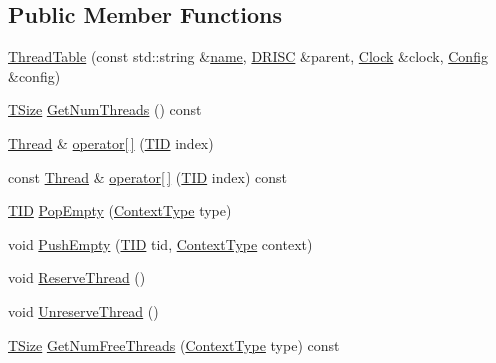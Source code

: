 \subsection*{Public Member Functions}
\begin{DoxyCompactItemize}
\item 
\hyperlink{class_simulator_1_1drisc_1_1_thread_table_af979f554a313e089a88590e09020aabd}{Thread\+Table} (const std\+::string \&\hyperlink{mtconf_8c_a8f8f80d37794cde9472343e4487ba3eb}{name}, \hyperlink{class_simulator_1_1_d_r_i_s_c}{D\+R\+I\+S\+C} \&parent, \hyperlink{class_simulator_1_1_clock}{Clock} \&clock, \hyperlink{class_config}{Config} \&config)
\item 
\hyperlink{namespace_simulator_aefe00209f3ea9f8e24874de522c3c3e7}{T\+Size} \hyperlink{class_simulator_1_1drisc_1_1_thread_table_a2df281eb0c42f337b5183f64367a4d29}{Get\+Num\+Threads} () const 
\item 
\hyperlink{struct_simulator_1_1drisc_1_1_thread}{Thread} \& \hyperlink{class_simulator_1_1drisc_1_1_thread_table_a19d5cbc35cf65207390d7cbf8863a253}{operator\mbox{[}$\,$\mbox{]}} (\hyperlink{namespace_simulator_a483cc4ecee1736e895054617672cded5}{T\+I\+D} index)
\item 
const \hyperlink{struct_simulator_1_1drisc_1_1_thread}{Thread} \& \hyperlink{class_simulator_1_1drisc_1_1_thread_table_a008ee3ecda024bb2d03226d26c0fc7fe}{operator\mbox{[}$\,$\mbox{]}} (\hyperlink{namespace_simulator_a483cc4ecee1736e895054617672cded5}{T\+I\+D} index) const 
\item 
\hyperlink{namespace_simulator_a483cc4ecee1736e895054617672cded5}{T\+I\+D} \hyperlink{class_simulator_1_1drisc_1_1_thread_table_ac0abe8957aba5d10a90333fa1db5e662}{Pop\+Empty} (\hyperlink{namespace_simulator_ab3233bd11b43e37322a8111dc7eec133}{Context\+Type} type)
\item 
void \hyperlink{class_simulator_1_1drisc_1_1_thread_table_a8668e92ff7f8f758580841b92537df28}{Push\+Empty} (\hyperlink{namespace_simulator_a483cc4ecee1736e895054617672cded5}{T\+I\+D} tid, \hyperlink{namespace_simulator_ab3233bd11b43e37322a8111dc7eec133}{Context\+Type} context)
\item 
void \hyperlink{class_simulator_1_1drisc_1_1_thread_table_a3bfc727248255dd822e883b741b8478d}{Reserve\+Thread} ()
\item 
void \hyperlink{class_simulator_1_1drisc_1_1_thread_table_ad8c0a9db5d4c483fd76f24e5fc4dc792}{Unreserve\+Thread} ()
\item 
\hyperlink{namespace_simulator_aefe00209f3ea9f8e24874de522c3c3e7}{T\+Size} \hyperlink{class_simulator_1_1drisc_1_1_thread_table_a1d681b9bf94368b3a68bd7e701e1746d}{Get\+Num\+Free\+Threads} (\hyperlink{namespace_simulator_ab3233bd11b43e37322a8111dc7eec133}{Context\+Type} type) const 

\end{DoxyCompactItemize}
